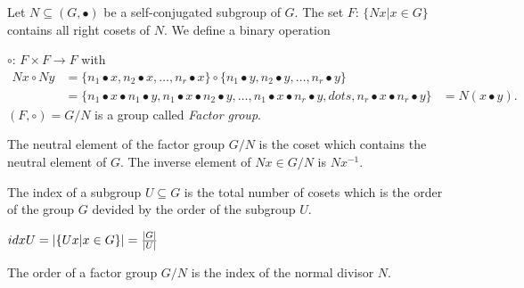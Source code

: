 \begin{dfn}\label{dfn:19_factor-group}
Let $N \subseteq (G, \bullet)$ be a self-conjugated subgroup of $G$. The set $F: \, \lbrace Nx | x \in G \rbrace$ contains all right cosets of $N$. We define a binary operation \par
$\circ: \, F \times F \rightarrow F$ with
\begin{align*}
Nx \circ Ny 	&= \lbrace n_1 \bullet x, n_2 \bullet x, \dots, n_r \bullet x \rbrace \circ \lbrace n_1 \bullet y, n_2 \bullet y, \dots, n_r \bullet y \rbrace \\
				&= \lbrace n_1 \bullet x \bullet n_1 \bullet y, n_1 \bullet x \bullet n_2 \bullet y, \dots, n_1 \bullet x \bullet n_r \bullet y, dots, n_r \bullet x \bullet n_r \bullet y \rbrace 
				&= N(x \bullet y).
\end{align*}
$(F, \circ) = G/N$ is a group called \textit{Factor group}.
\end{dfn}

The neutral element of the factor group $G/N$ is the coset which contains the neutral element of $G$. The inverse element of $Nx \in G/N$ is $Nx^{-1}$. 

\begin{dfn}[Index]\label{dfn:110_subgroup_index}
The index of a subgroup $U \subseteq G$ is the total number of cosets which is the order of the group $G$ devided by the order of the subgroup $U$. \par 
$idx U = \left| \lbrace Ux | x \in G \rbrace \right| = \frac{\left| G \right|}{\left| U \right|}$ 
\end{dfn}

The order of a factor group $G/N$ is the index of the normal divisor $N$. 


